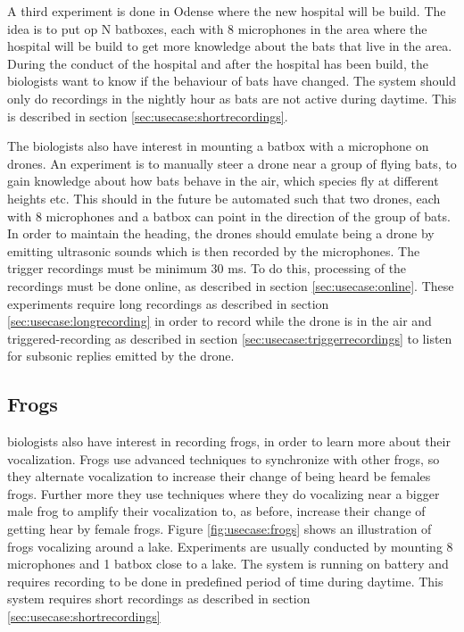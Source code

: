 A third experiment is done in Odense where the new hospital will be build.
The idea is to put op N batboxes, each with 8 microphones in the area where the hospital will be build to get more knowledge about the bats that live in the area. During the conduct of the hospital and after the hospital has been build, the biologists want to know if the behaviour of bats have changed. The system should only do recordings in the nightly hour as bats are not active during daytime. This is described in section \ref{sec:usecase:shortrecordings}.

The biologists also have interest in mounting a batbox with a microphone on drones. An experiment is to manually steer a drone near a group of flying bats, to gain knowledge about how bats behave in the air, which species fly at different heights etc. This should in the future be automated such that two drones, each with 8 microphones and a batbox can point in the direction of the group of bats. In order to maintain the heading, the drones should emulate being a drone by emitting ultrasonic sounds which is then recorded by the microphones. The trigger recordings must be minimum 30 ms. To do this, processing of the recordings must be done online, as described in section \ref{sec:usecase:online}.
These experiments require long recordings as described in section \ref{sec:usecase:longrecording} in order to record while the drone is in the air and triggered-recording as described in section \ref{sec:usecase:triggerrecordings} to listen for subsonic replies emitted by the drone.

\subsection{Frogs}
biologists also have interest in recording frogs, in order to learn more about their vocalization. Frogs use advanced techniques to synchronize with other frogs, so they alternate vocalization to increase their change of being heard be females frogs. Further more they use techniques where they do vocalizing near a bigger male frog to amplify their vocalization to, as before, increase their change of getting hear by female frogs. Figure \ref{fig:usecase:frogs} shows an illustration of frogs vocalizing around a lake. Experiments are usually conducted by mounting 8 microphones and 1 batbox close to a lake. The system is running on battery and requires recording to be done in predefined period of time during daytime. This system requires short recordings as described in section \ref{sec:usecase:shortrecordings}

